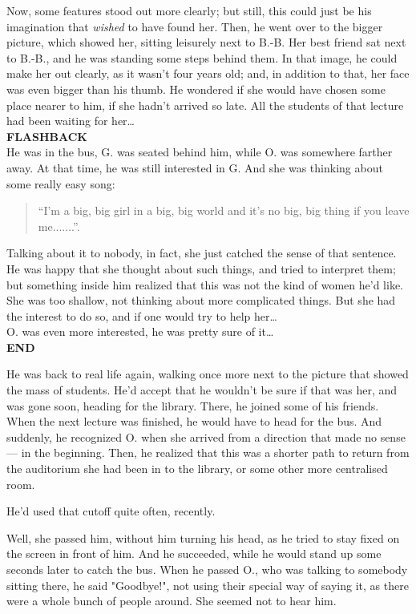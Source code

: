 Now, some features stood out more clearly; but still, this could just be his imagination that \emph{wished} to have found her. Then, he went over to the bigger picture, which showed her, sitting leisurely next to B.-B. 
Her best friend sat next to B.-B., and he was standing some steps behind them. In that image, he could make her out clearly, as it wasn't four years old; and, in addition to that, her face was even bigger than his thumb. 
He wondered if she would have chosen some place nearer to him, if she hadn't arrived so late. All the students of that lecture had been waiting for her\ldots\\
\textbf{FLASHBACK}\\
He was in the bus, G. was seated behind him, while O. was somewhere farther away. At that time, he was still interested in G. 
And she was thinking about some really easy song: 
\begin{quote}
  \enquote{I'm a big, big girl in a big, big world and it's no big, big thing if you leave me.......}.
\end{quote}
Talking about it to nobody, in fact, she just catched the sense of that sentence. 
He was happy that she thought about such things, and tried to interpret them; but something inside him realized that this was not the kind of women he'd like. She was too shallow, not thinking about more complicated things. But she had the interest to do so, and if one would try to help her\ldots\\
O. was even more interested, he was pretty sure of it\ldots\\
\textbf{END}

He was back to real life again, walking once more next to the picture that showed the mass of students. 
He'd accept that he wouldn't be sure if that was her, and was gone soon, heading for the library. There, he joined some of his friends. 
When the next lecture was finished, he would have to head for the bus. 
And suddenly, he recognized O. when she arrived from a direction that made no sense --- in the beginning. Then, he realized that this was a shorter path to return from the auditorium she had been in to the library, or some other more centralised room.

He'd used that cutoff quite often, recently. 

Well, she passed him, without him turning his head, as he tried to stay fixed on the screen in front of him. 
And he succeeded, while he would stand up some seconds later to catch the bus. When he passed O., who was talking to somebody sitting there, he said "Goodbye!", not using their special way of saying it, as there were a whole bunch of people around. 
She seemed not to hear him.

